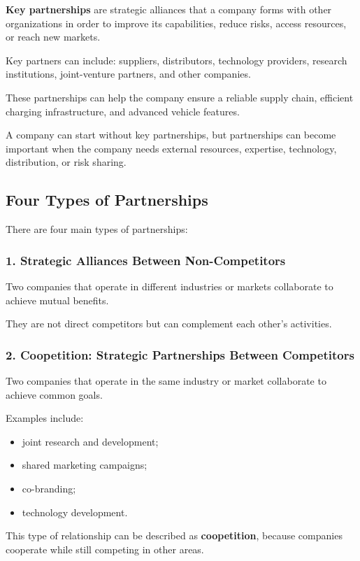 \documentclass[12pt,a4paper]{report}
\begin{document}
\textbf{Key partnerships} are strategic alliances that a company forms with other organizations in order to improve its capabilities, reduce risks, access resources, or reach new markets.

Key partners can include: suppliers, distributors, technology providers, research institutions, joint-venture partners, and other companies.


These partnerships can help the company ensure a reliable supply chain, efficient charging infrastructure, and advanced vehicle features.

A company can start without key partnerships, but partnerships can become important when the company needs external resources, expertise, technology, distribution, or risk sharing.

\subsection{Four Types of Partnerships}

There are four main types of partnerships:

\subsubsection{1. Strategic Alliances Between Non-Competitors}

Two companies that operate in different industries or markets collaborate to achieve mutual benefits.

They are not direct competitors but can complement each other's activities.

\subsubsection{2. Coopetition: Strategic Partnerships Between Competitors}

Two companies that operate in the same industry or market collaborate to achieve common goals.

Examples include:

\begin{itemize}
    \item joint research and development;
    \item shared marketing campaigns;
    \item co-branding;
    \item technology development.
\end{itemize}

This type of relationship can be described as \textbf{coopetition}, because companies cooperate while still competing in other areas.
\end{document}
